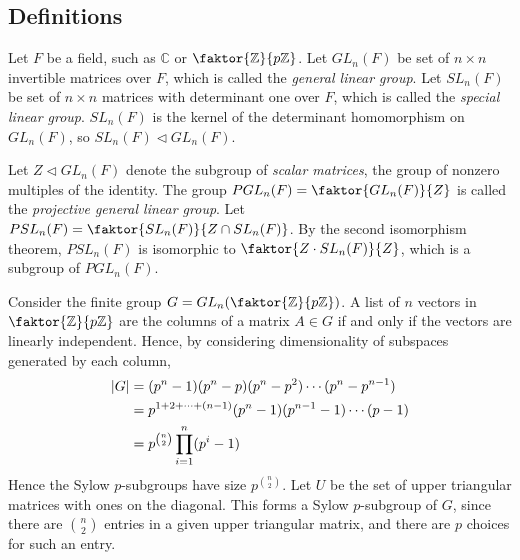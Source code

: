\subsection{Definitions}
\begin{definition}
	Let \( F \) be a field, such as \( \mathbb C \) or \( \faktor{\mathbb Z}{p \mathbb Z} \).
	Let \( GL_n(F) \) be set of \( n \times n \) invertible matrices over \( F \), which is called the \textit{general linear group}.
	Let \( SL_n(F) \) be set of \( n \times n \) matrices with determinant one over \( F \), which is called the \textit{special linear group}.
	\( SL_n(F) \) is the kernel of the determinant homomorphism on \( GL_n(F) \), so \( SL_n(F) \triangleleft GL_n(F) \).

	Let \( Z \triangleleft GL_n(F) \) denote the subgroup of \textit{scalar matrices}, the group of nonzero multiples of the identity.
	The group \( PGL_n(F) = \faktor{GL_n(F)}{Z} \) is called the \textit{projective general linear group}.
	Let \( PSL_n(F) = \faktor{SL_n(F)}{Z \cap SL_n(F)} \).
	By the second isomorphism theorem, \( PSL_n(F) \) is isomorphic to \( \faktor{Z \cdot SL_n(F)}{Z} \), which is a subgroup of \( PGL_n(F) \).
\end{definition}
\begin{example}
	Consider the finite group \( G = GL_n\qty(\faktor{\mathbb Z}{p\mathbb Z}) \).
	A list of \( n \) vectors in \( \faktor{\mathbb Z}{p\mathbb Z} \) are the columns of a matrix \( A \in G \) if and only if the vectors are linearly independent.
	Hence, by considering dimensionality of subspaces generated by each column,
	\begin{align*}
		\abs{G} & = (p^n - 1)(p^n - p)(p^n - p^2) \cdots (p^n - p^{n-1})      \\
		        & = p^{1+2+\dots+(n-1)} (p^n - 1)(p^{n-1} - 1) \cdots (p - 1) \\
		        & = p^{\binom{n}{2}} \prod_{i=1}^n (p^i - 1)
	\end{align*}
	Hence the Sylow \( p \)-subgroups have size \( p^{\binom{n}{2}} \).
	Let \( U \) be the set of upper triangular matrices with ones on the diagonal.
	This forms a Sylow \( p \)-subgroup of \( G \), since there are \( \binom{n}{2} \) entries in a given upper triangular matrix, and there are \( p \) choices for such an entry.
\end{example}

